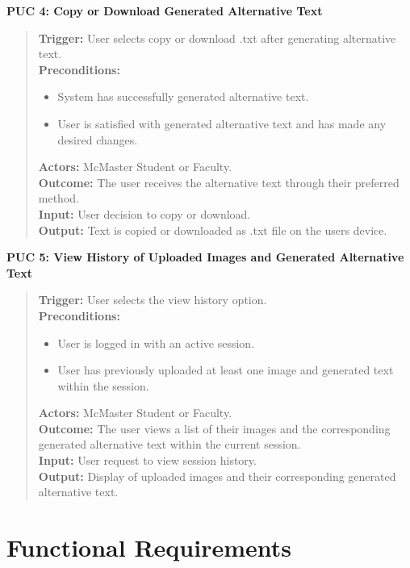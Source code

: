 \documentclass[12pt]{article}
\begin{document}
\textbf{PUC 4: Copy or Download Generated Alternative Text }
\begin{quote}
\textbf{Trigger:} User selects copy or download .txt after generating alternative text.\\
\textbf{Preconditions:}
\begin{itemize}
  \item System has successfully generated alternative text.
  \item User is satisfied with generated alternative text and has made any desired changes. 
\end{itemize}
\textbf{Actors:} McMaster Student or Faculty. \\
\textbf{Outcome:} The user receives the alternative text through their preferred method. \\
\textbf{Input:} User decision to copy or download.\\
\textbf{Output:} Text is copied or downloaded as .txt file on the users device.
\end{quote}
\textbf{PUC 5: View History of Uploaded Images and Generated Alternative Text}
\begin{quote}
\textbf{Trigger:} User selects the view history option.\\
\textbf{Preconditions:}
\begin{itemize}
  \item User is logged in with an active session. 
  \item User has previously uploaded at least one image and generated text within the session. 
\end{itemize}
\textbf{Actors:} McMaster Student or Faculty.\\
\textbf{Outcome:} The user views a list of their images and the corresponding generated alternative text within the current session. \\
\textbf{Input:} User request to view session history.\\
\textbf{Output:} Display of uploaded images and their corresponding generated alternative text.\\
\end{quote}



\section{Functional Requirements}
\end{document}
